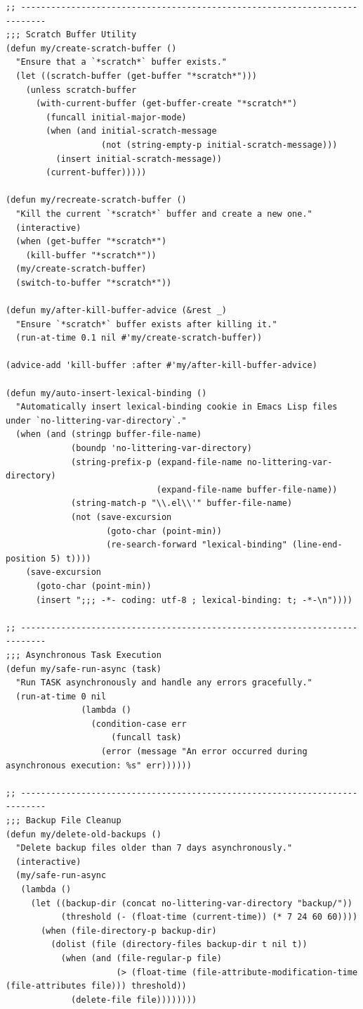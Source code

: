 \documentclass[11pt]{article}
\begin{document}
\begin{verbatim}
;; ---------------------------------------------------------------------------
;;; Scratch Buffer Utility
(defun my/create-scratch-buffer ()
  "Ensure that a `*scratch*` buffer exists."
  (let ((scratch-buffer (get-buffer "*scratch*")))
    (unless scratch-buffer
      (with-current-buffer (get-buffer-create "*scratch*")
        (funcall initial-major-mode)
        (when (and initial-scratch-message
                   (not (string-empty-p initial-scratch-message)))
          (insert initial-scratch-message))
        (current-buffer)))))

(defun my/recreate-scratch-buffer ()
  "Kill the current `*scratch*` buffer and create a new one."
  (interactive)
  (when (get-buffer "*scratch*")
    (kill-buffer "*scratch*"))
  (my/create-scratch-buffer)
  (switch-to-buffer "*scratch*"))

(defun my/after-kill-buffer-advice (&rest _)
  "Ensure `*scratch*` buffer exists after killing it."
  (run-at-time 0.1 nil #'my/create-scratch-buffer))

(advice-add 'kill-buffer :after #'my/after-kill-buffer-advice)

(defun my/auto-insert-lexical-binding ()
  "Automatically insert lexical-binding cookie in Emacs Lisp files under `no-littering-var-directory`."
  (when (and (stringp buffer-file-name)
             (boundp 'no-littering-var-directory)
             (string-prefix-p (expand-file-name no-littering-var-directory)
                              (expand-file-name buffer-file-name))
             (string-match-p "\\.el\\'" buffer-file-name)
             (not (save-excursion
                    (goto-char (point-min))
                    (re-search-forward "lexical-binding" (line-end-position 5) t))))
    (save-excursion
      (goto-char (point-min))
      (insert ";;; -*- coding: utf-8 ; lexical-binding: t; -*-\n"))))

;; ---------------------------------------------------------------------------
;;; Asynchronous Task Execution
(defun my/safe-run-async (task)
  "Run TASK asynchronously and handle any errors gracefully."
  (run-at-time 0 nil
               (lambda ()
                 (condition-case err
                     (funcall task)
                   (error (message "An error occurred during asynchronous execution: %s" err))))))

;; ---------------------------------------------------------------------------
;;; Backup File Cleanup
(defun my/delete-old-backups ()
  "Delete backup files older than 7 days asynchronously."
  (interactive)
  (my/safe-run-async
   (lambda ()
     (let ((backup-dir (concat no-littering-var-directory "backup/"))
           (threshold (- (float-time (current-time)) (* 7 24 60 60))))
       (when (file-directory-p backup-dir)
         (dolist (file (directory-files backup-dir t nil t))
           (when (and (file-regular-p file)
                      (> (float-time (file-attribute-modification-time (file-attributes file))) threshold))
             (delete-file file))))))))


\end{verbatim}
\end{document}
